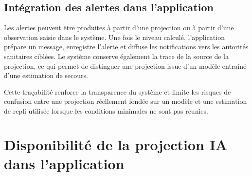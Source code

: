 \begin{table}[H]
  \centering
  \caption{Niveaux d'alerte visibles dans SAFE CONGO}
  \label{tab:niveaux_alerte}
\end{table}

\subsection{Intégration des alertes dans l'application}

Les alertes peuvent être produites à partir d'une projection ou à partir d'une observation saisie dans le système. Une fois le niveau calculé, l'application prépare un message, enregistre l'alerte et diffuse les notifications vers les autorités sanitaires ciblées. Le système conserve également la trace de la source de la projection, ce qui permet de distinguer une projection issue d'un modèle entraîné d'une estimation de secours.

Cette traçabilité renforce la transparence du système et limite les risques de confusion entre une projection réellement fondée sur un modèle et une estimation de repli utilisée lorsque les conditions minimales ne sont pas réunies.

\section{Disponibilité de la projection IA dans l'application}


